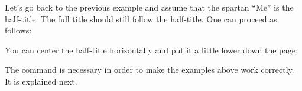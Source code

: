 \begin{Example}
  Let's go back to the previous example and assume
  that the spartan ``Me'' is the half-title. The full title should
  still follow the half-title. One can proceed as follows:
\ifCommonmaincls
{}
\else
\fi
  You can center the half-title horizontally and put it a little lower down
  the page:
\ifCommonmaincls
{}
\else
  \fi%
  The command  is necessary in order to make
  the examples above work correctly. It is explained next.
\end{Example}
%
\EndIndexGroup


